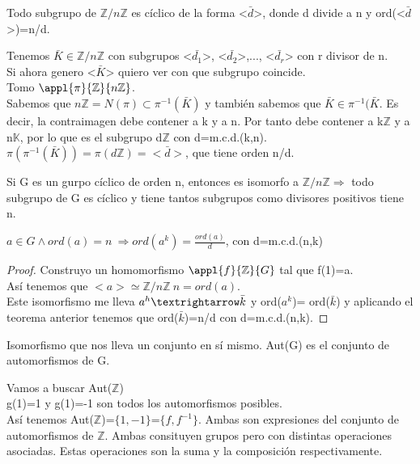 \documentclass{apuntes}
\begin{document}
 \begin{theorem}
  Todo subgrupo de $\mathbb{Z}/n\mathbb{Z}$  es cíclico de la forma <$\bar{d}$>, donde d divide a n y ord(<$\bar{d}$>)=n/d.
 \end{theorem}
\begin{example}
 Tenemos $\bar{K}\in \mathbb{Z}/n\mathbb{Z}$  con subgrupos <$\bar{d_1}$>, <$\bar{d_2}$>,..., <$\bar{d_r}$> con r divisor de n.\\
 Si ahora genero <$\bar{K}$> quiero ver con que subgrupo coincide.\\
 Tomo $\appl{\pi}{\mathbb{Z}}{n\mathbb{Z}}$.\\
 Sabemos que $n\mathbb{Z}=N(\pi) \subset \pi^{-1}(\bar{K})$  y también sabemos que $\bar{K} \in \pi^{-1}(\bar{K}$. Es decir,
 la contraimagen debe contener a k y a n. Por tanto debe contener a k$\mathbb{Z}$  y a n$\mathbb{K}$, por lo que es el subgrupo
 d$\mathbb{Z}$  con d=m.c.d.(k,n).\\
 $\pi(\pi^{-1}(\bar{K}))=\pi(d\mathbb{Z})=<\bar{d}>$, que tiene orden n/d.
\end{example}

Si G es un gurpo cíclico de orden n, entonces es isomorfo a $\mathbb{Z}/n\mathbb{Z} \Rightarrow$  todo subgrupo de G es cíclico y 
tiene tantos subgrupos como divisores positivos tiene n.

\begin{theorem}
 $a\in G \wedge ord(a)=n \ \Rightarrow ord(a^{k})=\frac{ord(a)}{d}$, con d=m.c.d.(n,k)
\end{theorem}

\begin{proof}
 Construyo un homomorfismo $\appl{f}{\mathbb{Z}}{G}$  tal que f(1)=a. \\
 Así tenemos que $<a>\simeq \mathbb{Z}/n\mathbb{Z} \ n=ord(a)$.\\
 Este isomorfismo me lleva $a^{h}\textrightarrow \bar{k}$  y ord($a^{k}$)= ord($\bar{k}$) y  aplicando el teorema anterior tenemos
 que ord($\bar{k}$)=n/d con d=m.c.d.(n,k).
\end{proof}

\begin{defn}[Automorfismo]
 Isomorfismo que nos lleva un conjunto en sí mismo. Aut(G) es el conjunto de automorfismos de G.
\end{defn}

\begin{example}
 Vamos a buscar Aut($\mathbb{Z}$)\\
 g(1)=1 y g(1)=-1 son todos los automorfismos posibles.\\
 Así tenemos Aut($\mathbb{Z}$)=$\{1,-1\}$=$\{f, f^{-1}\}$. Ambas son expresiones del conjunto de automorfismos de $\mathbb{Z}$. Ambas
 consituyen grupos pero con distintas operaciones asociadas. Estas operaciones son la suma y la composición respectivamente.
\end{example}
\end{document}

